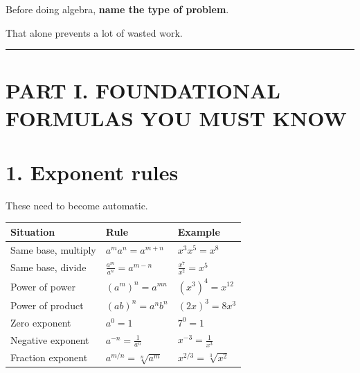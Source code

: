 \documentclass[
]{article}
\newcounter{none} %
\begin{document}
Before doing algebra, \textbf{name the type of problem}.

That alone prevents a lot of wasted work.

\begin{center}\rule{0.5\linewidth}{0.5pt}\end{center}

\section{PART I. FOUNDATIONAL FORMULAS YOU MUST
KNOW}\label{part-i.-foundational-formulas-you-must-know}

\section{1. Exponent rules}\label{exponent-rules}

These need to become automatic.

{\def\LTcaptype{none} %
\begin{longtable}[]{@{}
  >{\raggedright\arraybackslash}p{}
  >{\raggedright\arraybackslash}p{}
  >{\raggedright\arraybackslash}p{}@{}}
\toprule\noalign{}
\begin{minipage}[b]{\linewidth}\raggedright
Situation
\end{minipage} & \begin{minipage}[b]{\linewidth}\raggedright
Rule
\end{minipage} & \begin{minipage}[b]{\linewidth}\raggedright
Example
\end{minipage} \\
\midrule\noalign{}
\endhead
\bottomrule\noalign{}
\endlastfoot
Same base, multiply & \(a^m a^n=a^{m+n}\) & \(x^3x^5=x^8\) \\
Same base, divide & \(\frac{a^m}{a^n}=a^{m-n}\) &
\(\frac{x^7}{x^2}=x^5\) \\
Power of power & \((a^m)^n=a^{mn}\) & \((x^3)^4=x^{12}\) \\
Power of product & \((ab)^n=a^nb^n\) & \((2x)^3=8x^3\) \\
Zero exponent & \(a^0=1\) & \(7^0=1\) \\
Negative exponent & \(a^{-n}=\frac1{a^n}\) & \(x^{-3}=\frac1{x^3}\) \\
Fraction exponent & \(a^{m/n}=\sqrt[n]{a^m}\) &
\(x^{2/3}=\sqrt[3]{x^2}\) \\
\end{longtable}
}
\end{document}
